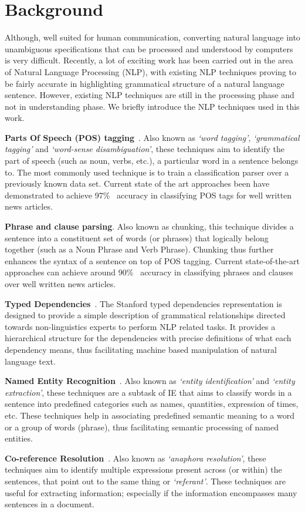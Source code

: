 \section{Background}
\label{sec:background}

Although, well suited for human communication, converting natural language into unambiguous specifications that can be processed and understood by computers is very difficult.  Recently, a lot of exciting work has been carried out in the area of Natural Language Processing (NLP), with existing NLP techniques proving to be fairly accurate in highlighting grammatical structure of a natural language sentence. However, existing NLP techniques are still in the processing phase and not in understanding phase.  We briefly introduce the NLP techniques used in this work.


\textbf{Parts Of Speech (POS) tagging}~\cite{Klein03,KleinNIPS03}. Also known as \textit{`word tagging'}, \textit{`grammatical tagging'} and \textit{`word-sense disambiguation'}, these techniques aim to identify the part of speech (such as noun, verbs, etc.), a particular word in a sentence belongs to. The most commonly used technique is to train a classification parser over a previously known data set. Current state of the art approaches been have demonstrated to achieve 97\%~\cite{SNLP1} accuracy in classifying POS tags for well written news articles.

\textbf{Phrase and clause parsing}. Also known as chunking, this technique divides a sentence into a constituent set of words (or phrases) that logically belong together (such as a Noun Phrase and Verb Phrase). Chunking thus further enhances the syntax of a sentence on top of POS tagging. Current state-of-the-art approaches can achieve around 90\%~\cite{SNLP1} accuracy in classifying phrases and clauses over well written news articles.

\textbf{Typed Dependencies}~\cite{Marneffe06LREC,Marneffe08COLING}. The Stanford typed dependencies representation  is designed to provide a simple description of grammatical relationships directed towards non-linguistics experts to perform NLP related tasks. It provides a hierarchical structure for the dependencies with precise definitions of what each dependency means, thus facilitating machine based manipulation of natural language text.

\textbf{Named Entity Recognition}~\cite{Finkel05ACL}. Also known as \textit{`entity identification'} and \textit{`entity extraction'}, these techniques are a subtask of IE that aims to classify words in a sentence into predefined categories such as names, quantities, expression of times, etc. These techniques help in associating predefined semantic meaning to a word or a group of words (phrase), thus facilitating semantic processing of named entities. 

\textbf{Co-reference Resolution}~\cite{RaghunathanEMNLP10,LeeCoNLL11}. Also known as \textit{`anaphora resolution'}, these techniques aim to identify multiple expressions present across (or within) the sentences, that point out to the same thing or \textit{`referant'}. These techniques are useful for extracting information; especially if the information encompasses many sentences in a document. 